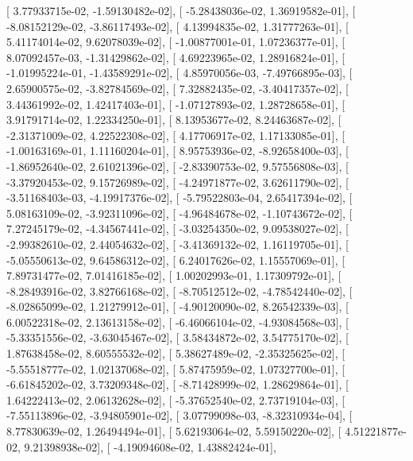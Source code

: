 \documentclass{article}
\begin{document}
       [  3.77933715e-02,  -1.59130482e-02],
       [ -5.28438036e-02,   1.36919582e-01],
       [ -8.08152129e-02,  -3.86117493e-02],
       [  4.13994835e-02,   1.31777263e-01],
       [  5.41174014e-02,   9.62078039e-02],
       [ -1.00877001e-01,   1.07236377e-01],
       [  8.07092457e-03,  -1.31429862e-02],
       [  4.69223965e-02,   1.28916824e-01],
       [ -1.01995224e-01,  -1.43589291e-02],
       [  4.85970056e-03,  -7.49766895e-03],
       [  2.65900575e-02,  -3.82784569e-02],
       [  7.32882435e-02,  -3.40417357e-02],
       [  3.44361992e-02,   1.42417403e-01],
       [ -1.07127893e-02,   1.28728658e-01],
       [  3.91791714e-02,   1.22334250e-01],
       [  8.13953677e-02,   8.24463687e-02],
       [ -2.31371009e-02,   4.22522308e-02],
       [  4.17706917e-02,   1.17133085e-01],
       [ -1.00163169e-01,   1.11160204e-01],
       [  8.95753936e-02,  -8.92658400e-03],
       [ -1.86952640e-02,   2.61021396e-02],
       [ -2.83390753e-02,   9.57556808e-03],
       [ -3.37920453e-02,   9.15726989e-02],
       [ -4.24971877e-02,   3.62611790e-02],
       [ -3.51168403e-03,  -4.19917376e-02],
       [ -5.79522803e-04,   2.65417394e-02],
       [  5.08163109e-02,  -3.92311096e-02],
       [ -4.96484678e-02,  -1.10743672e-02],
       [  7.27245179e-02,  -4.34567441e-02],
       [ -3.03254350e-02,   9.09538027e-02],
       [ -2.99382610e-02,   2.44054632e-02],
       [ -3.41369132e-02,   1.16119705e-01],
       [ -5.05550613e-02,   9.64586312e-02],
       [  6.24017626e-02,   1.15557069e-01],
       [  7.89731477e-02,   7.01416185e-02],
       [  1.00202993e-01,   1.17309792e-01],
       [ -8.28493916e-02,   3.82766168e-02],
       [ -8.70512512e-02,  -4.78542440e-02],
       [ -8.02865099e-02,   1.21279912e-01],
       [ -4.90120090e-02,   8.26542339e-03],
       [  6.00522318e-02,   2.13613158e-02],
       [ -6.46066104e-02,  -4.93084568e-03],
       [ -5.33351556e-02,  -3.63045467e-02],
       [  3.58434872e-02,   3.54775170e-02],
       [  1.87638458e-02,   8.60555532e-02],
       [  5.38627489e-02,  -2.35325625e-02],
       [ -5.55518777e-02,   1.02137068e-02],
       [  5.87475959e-02,   1.07327700e-01],
       [ -6.61845202e-02,   3.73209348e-02],
       [ -8.71428999e-02,   1.28629864e-01],
       [  1.64222413e-02,   2.06132628e-02],
       [ -5.37652540e-02,   2.73719104e-03],
       [ -7.55113896e-02,  -3.94805901e-02],
       [  3.07799098e-03,  -8.32310934e-04],
       [  8.77830639e-02,   1.26494494e-01],
       [  5.62193064e-02,   5.59150220e-02],
       [  4.51221877e-02,   9.21398938e-02],
       [ -4.19094608e-02,   1.43882424e-01],
\end{document}
